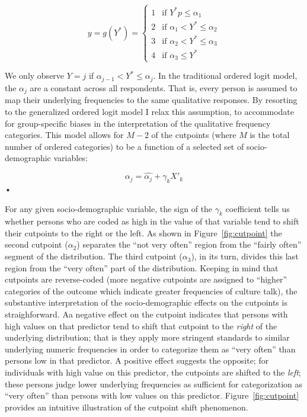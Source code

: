 \documentclass[11pt]{article}
\begin{document}
\begin{equation}
	y=g(Y^{*})=\left\{\begin{array}{rl}
	  1 &\mbox{if $Y^{*}p \leq \alpha_{1}$} \\
	  2 &\mbox{if $\alpha_{1} < Y^{*} \leq \alpha_{2}$}\\ 
	  3 &\mbox{if $\alpha_{2} <Y^{*} \leq \alpha_{3}$}\\ 
	  4 &\mbox{if $\alpha_{3} \leq Y^{*}$} 
	 \end{array} \right.
	 \label{eq:equation3}
\end{equation}
 
We only observe $Y=j$ if $\alpha_{j-1} < Y^{*} \leq \alpha_{j}$.  In the traditional ordered logit model, the $\alpha_j$ are a constant across all respondents.  That is, every person is assumed to map their underlying frequencies to the same qualitative responses.  By resorting to the generalized ordered logit model I relax this assumption, to accommodate for group-specific biases in the interpretation of the qualitative frequency categories. This model allows for $M-2$ of the cutpoints (where $M$ is the total number of ordered categories) to be a function of a selected set of socio-demographic variables:

\begin{equation}
\alpha_j=\hat{\alpha_j}+\gamma_kX'_k
\end{equation}•

For any given socio-demographic variable, the sign of the $\gamma_k$ coefficient tells us whether persons who are coded as high in the value of that variable tend to shift their cutpoints to the right or the left.  As shown in Figure~\ref{fig:cutpoint} the second cutpoint ($\alpha_2$) separates the ``not very often'' region from the ``fairly often'' segment of the distribution.  The third cutpoint ($\alpha_3$), in its turn, divides this last region from the ``very often'' part of the distribution.  Keeping in mind that cutpoints are reverse-coded (more negative cutpoints are assigned to ``higher'' categories of the outcome which indicate greater frequencies of culture talk), the substantive interpretation of the socio-demographic effects on the cutpoints is straighforward.  Aa negative effect on the cutpoint indicates that persons with high values on that predictor tend to shift that cutpoint to the \emph{right} of the underlying distribution; that is they apply more stringent standards to similar underlying numeric frequencies in order to categorize them as ``very often'' than persons low in that predictor.  A positive effect suggests the opposite; for individuals with high value on this predictor, the cutpoints are shifted to the \emph{left}; these persons judge lower underlying frequencies as sufficient for categorization as ``very often'' than persons with low values on this predictor.  Figure~\ref{fig:cutpoint} provides an intuitive illustration of the cutpoint shift phenomenon.
\newpage

\newpage

\end{document}
